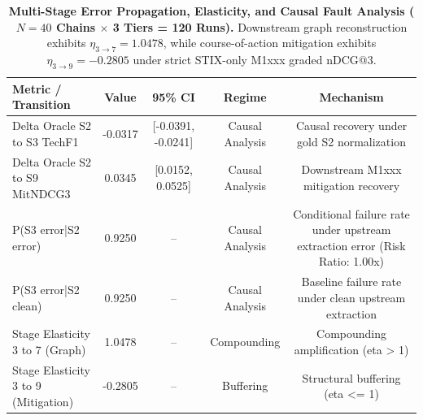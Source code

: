 \begin{table}[t]
\centering
\small
\caption{\textbf{Multi-Stage Error Propagation, Elasticity, and Causal Fault Analysis ($N=40$ Chains $\times$ 3 Tiers = 120 Runs).} Downstream graph reconstruction exhibits $\eta_{3 \to 7} = 1.0478$, while course-of-action mitigation exhibits $\eta_{3 \to 9} = -0.2805$ under strict STIX-only M1xxx graded nDCG@3.}
\label{tab:error_propagation}
\begin{tabular}{lcccc}
\toprule
\textbf{Metric / Transition} & \textbf{Value} & \textbf{95\% CI} & \textbf{Regime} & \textbf{Mechanism} \\
\midrule
Delta Oracle S2 to S3 TechF1 & -0.0317 & [-0.0391, -0.0241] & Causal Analysis & Causal recovery under gold S2 normalization \\
Delta Oracle S2 to S9 MitNDCG3 & 0.0345 & [0.0152, 0.0525] & Causal Analysis & Downstream M1xxx mitigation recovery \\
P(S3 error|S2 error) & 0.9250 & -- & Causal Analysis & Conditional failure rate under upstream extraction error (Risk Ratio: 1.00x) \\
P(S3 error|S2 clean) & 0.9250 & -- & Causal Analysis & Baseline failure rate under clean upstream extraction \\
Stage Elasticity 3 to 7 (Graph) & 1.0478 & -- & Compounding & Compounding amplification (eta > 1) \\
Stage Elasticity 3 to 9 (Mitigation) & -0.2805 & -- & Buffering & Structural buffering (eta <= 1) \\
\bottomrule
\end{tabular}
\end{table}
